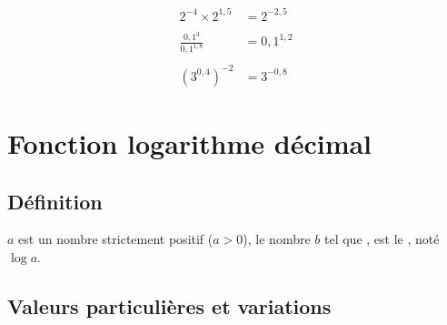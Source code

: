 \documentclass[xcolor={dvipsnames}]{beamer}
\begin{document}
\begin{frame}
	\begin{myex}
		
		\begin{align*}
		2^{-4} \times 2^{1,5} &= 2^{-2,5}\\\\
		\frac{0,1^3}{0,1^{1,8}} &= 0,1^{1,2}\\\\
		(3^{0,4})^{-2} &= 3^{-0,8}
		\end{align*}
	\end{myex}
\end{frame}


\section{Fonction logarithme décimal}

\subsection{Définition}

\begin{frame}
	\begin{mydef}
		$a$ est un nombre strictement positif ($a>0$), le nombre $b$ tel que , est le , noté $\log a$.
	\end{mydef}
\end{frame}


\subsection{Valeurs particulières et variations}
\end{document}
